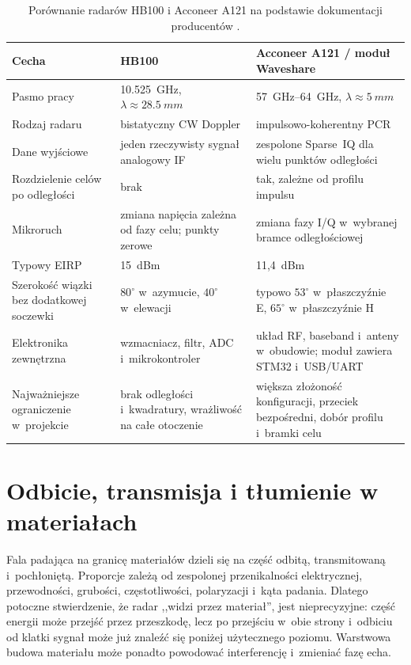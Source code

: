 \documentclass[12pt,a4paper,oneside]{report}
\begin{document}
\begin{table}[H]
\centering
\caption{Porównanie radarów HB100 i Acconeer A121 na podstawie dokumentacji
producentów \cite{hb100_doc,acconeer_datasheet,waveshare_a121}.}
\label{tab:hb100-a121}
\small
\begin{tabular}{@{}p{3.1cm}p{5.25cm}p{5.25cm}@{}}
\toprule
Cecha & HB100 & Acconeer A121 / moduł Waveshare \\
\midrule
Pasmo pracy & \SI{10.525}{GHz}, $\lambda\approx\SI{28.5}{mm}$
& \SIrange{57}{64}{GHz}, $\lambda\approx\SI{5}{mm}$ \\
Rodzaj radaru & bistatyczny CW Doppler & impulsowo-koherentny PCR \\
Dane wyjściowe & jeden rzeczywisty sygnał analogowy IF & zespolone Sparse~IQ
dla wielu punktów odległości \\
Rozdzielenie celów po odległości & brak & tak, zależne od profilu impulsu \\
Mikroruch & zmiana napięcia zależna od fazy celu; punkty zerowe & zmiana fazy
I/Q w~wybranej bramce odległościowej \\
Typowy EIRP & 15~dBm & 11{,}4~dBm \\
Szerokość wiązki bez dodatkowej soczewki & $80^\circ$ w~azymucie,
$40^\circ$ w~elewacji & typowo $53^\circ$ w~płaszczyźnie E,
$65^\circ$ w~płaszczyźnie H \\
Elektronika zewnętrzna & wzmacniacz, filtr, ADC i~mikrokontroler & układ RF,
baseband i~anteny w~obudowie; moduł zawiera STM32 i~USB/UART \\
Najważniejsze ograniczenie w~projekcie & brak odległości i~kwadratury,
wrażliwość na całe otoczenie & większa złożoność konfiguracji, przeciek
bezpośredni, dobór profilu i~bramki celu \\
\bottomrule
\end{tabular}
\end{table}

\section{Odbicie, transmisja i tłumienie w materiałach}
\label{sec:materialy-radar}

Fala padająca na granicę materiałów dzieli się na część odbitą, transmitowaną
i~pochłoniętą. Proporcje zależą od zespolonej przenikalności elektrycznej,
przewodności, grubości, częstotliwości, polaryzacji i~kąta padania. Dlatego
potoczne stwierdzenie, że radar ,,widzi przez materiał'', jest nieprecyzyjne:
część energii może przejść przez przeszkodę, lecz po przejściu w~obie strony
i~odbiciu od klatki sygnał może już znaleźć się poniżej użytecznego poziomu.
Warstwowa budowa materiału może ponadto powodować interferencję i~zmieniać fazę
echa.
\end{document}
